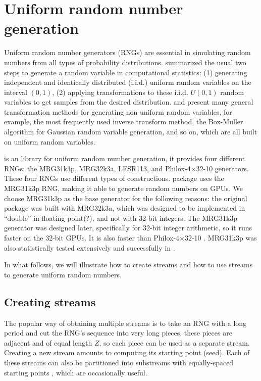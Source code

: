 \documentclass[article,nojss]{jss}\usepackage[]{graphicx}\usepackage[]{color}
\begin{document}
\section{Uniform random number generation} \label{}
Uniform random number generators (RNGs) are essential in simulating random numbers from all types of probability distributions. \cite{l2012random} summarized the usual two steps to generate a random variable in computational statistics: (1) generating independent and identically distributed (i.i.d.) uniform random variables on the interval $(0, 1)$, (2) applying transformations to these i.i.d. $U(0, 1)$ random variables to get samples from the desired distribution. \cite{l2012random} and \cite{robert2004random} present many general transformation methods for generating non-uniform random variables, for example, the most frequently used inverse transform method, the Box-Muller algorithm \citep{box1958note} for Gaussian random variable generation, and so on, which are all built on uniform random variables. %


 is an  library for uniform random number generation, it provides four different RNGs: the MRG31k3p, MRG32k3a, LFSR113, and Philox-4×32-10 generators. These four RNGs use different types of constructions.  package uses the MRG31k3p RNG, making it able to generate random numbers on GPUs. We choose MRG31k3p as the base generator for the following reasons:  the original  package \citep{l2002object} was built with MRG32k3a, which was designed to be implemented in ``double'' in floating point(?), and not with 32-bit integers. The MRG31k3p generator was designed later, specifically for 32-bit integer arithmetic, so it runs faster on the 32-bit GPUs.  It is also faster than Philox-4×32-10 \citep{rLEC00b}. MRG31k3p was also statistically tested extensively and successfully in \citep{rLEC07b}.    


In what follows, we will illustrate how to create streams and how to use streams to generate uniform random numbers. 


\subsection{Creating streams}\label{create_streams}
The popular way of obtaining multiple streams is to take an RNG with a long period and cut the RNG's sequence into very long pieces, these pieces are adjacent and of equal length $Z$, so each piece can be used as a separate stream. Creating a new stream amounts to computing its starting point (seed). Each of these streams can also be partitioned into substreams with equally-spaced starting points \citep{l2002object, rLEC15a}, which are occasionally useful.
\end{document}
